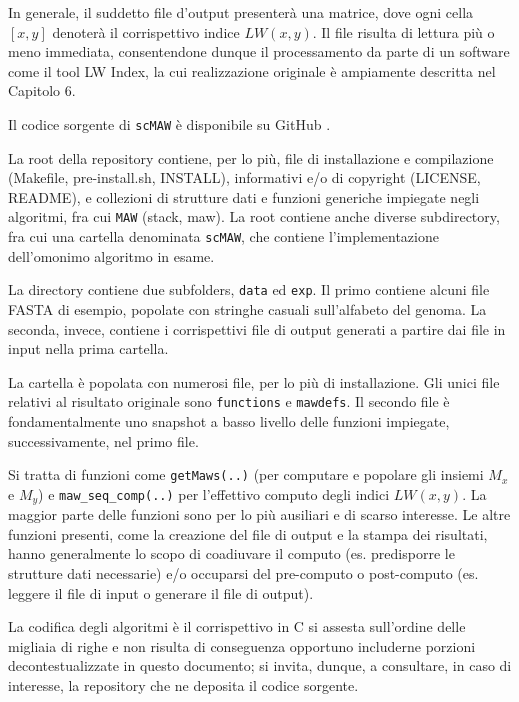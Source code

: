 \vspace{3mm}

In generale, il suddetto file d'output presenterà una matrice, dove ogni cella $[x,y]$ denoterà il corrispettivo indice $LW(x,y)$. Il file risulta di lettura più o meno immediata, consentendone dunque il processamento da parte di un software come il tool LW Index, la cui realizzazione originale è ampiamente descritta nel Capitolo 6.

\vspace{3mm}

Il codice sorgente di \verb|scMAW| è disponibile su GitHub \cite{mawGit}.

\vspace{3mm}

La root della repository contiene, per lo più, file di installazione e compilazione (Makefile, pre-install.sh, INSTALL), informativi e/o di copyright (LICENSE, README), e collezioni di strutture dati e funzioni generiche impiegate negli algoritmi, fra cui \verb|MAW| (stack, maw). La root contiene anche diverse subdirectory, fra cui una cartella denominata \verb|scMAW|, che contiene l'implementazione dell'omonimo algoritmo in esame.

\vspace{3mm}

La directory contiene due subfolders, \verb|data| ed \verb|exp|. Il primo contiene alcuni file FASTA di esempio, popolate con stringhe casuali sull'alfabeto del genoma. La seconda, invece, contiene i corrispettivi file di output generati a partire dai file in input nella prima cartella. 

La cartella è popolata con numerosi file, per lo più di installazione.  Gli unici file relativi al risultato originale sono \verb|functions| e \verb|mawdefs|. Il secondo file è fondamentalmente uno snapshot a basso livello delle funzioni impiegate, successivamente, nel primo file. 

Si tratta di funzioni come \verb|getMaws(..)| (per computare e popolare gli insiemi $M_x$ e $M_y$) e \verb|maw_seq_comp(..)| per l'effettivo computo degli indici $LW(x,y)$. La maggior parte delle funzioni sono per lo più ausiliari e di scarso interesse. Le altre funzioni presenti, come la creazione del file di output e la stampa dei risultati, hanno generalmente lo scopo di coadiuvare il computo (es. predisporre le strutture dati necessarie) e/o occuparsi del pre-computo o post-computo (es. leggere il file di input o generare il file di output).

\vspace{3mm}

La codifica degli algoritmi è il corrispettivo in C si assesta sull'ordine delle migliaia di righe e non risulta di conseguenza opportuno includerne porzioni decontestualizzate in questo documento; si invita, dunque, a consultare, in caso di interesse, la repository che ne deposita il codice sorgente.